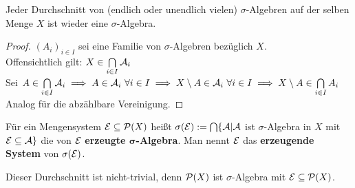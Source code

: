   \begin{theorem}
    Jeder Durchschnitt von (endlich oder unendlich vielen) $\sigma$-Algebren auf der selben Menge $X$ ist wieder eine $\sigma$-Algebra.
  \end{theorem}

  \begin{proof}
    $(A_i)_{i \in I}$ sei eine Familie von $\sigma$-Algebren bezüglich $X$.\\
    Offensichtlich gilt: $X \in \bigcap\limits_{i \in I} \mathcal{A}_i$\\
    Sei $A \in \bigcap\limits_{i \in I} \mathcal{A}_i \implies A \in \mathcal{A}_i \ \forall i \in I \implies X \setminus A \in \mathcal{A}_i \ \forall i \in I \implies X \setminus A \in \bigcap\limits_{i \in I} A_i$\\
    Analog für die abzählbare Vereinigung.
  \end{proof}

  \begin{definition}
    Für ein Mengensystem $\mathcal{E} \subseteq \mathcal{P}(X)$ heißt $\sigma(\mathcal{E}) := \bigcap\{\mathcal{A}|\mathcal{A}$ ist $\sigma$-Algebra in $X$ mit $\mathcal{E} \subseteq \mathcal{A}\}$ die von $\mathcal{E}$ \textbf{erzeugte $\bm{\sigma}$-Algebra}. Man nennt $\mathcal{E}$ das \textbf{erzeugende System} von $\sigma(\mathcal{E})$.
  \end{definition}

  \begin{remark}
    Dieser Durchschnitt ist nicht-trivial, denn $\mathcal{P}(X)$ ist $\sigma$-Algebra mit $\mathcal{E} \subseteq \mathcal{P}(X)$.
  \end{remark}

